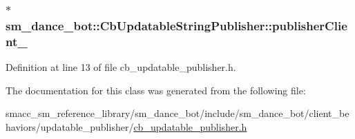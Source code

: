 \subsubsection[{\texorpdfstring{publisher\+Client\+\_\+}{publisherClient_}}]{$\ast$ sm\+\_\+dance\+\_\+bot\+::\+Cb\+Updatable\+String\+Publisher\+::publisher\+Client\+\_\+}\hypertarget{classsm__dance__bot_1_1CbUpdatableStringPublisher_a4dbf2a2bd48ce6193617e5aba596caaf}{}\label{classsm__dance__bot_1_1CbUpdatableStringPublisher_a4dbf2a2bd48ce6193617e5aba596caaf}


Definition at line 13 of file cb\+\_\+updatable\+\_\+publisher.\+h.



The documentation for this class was generated from the following file\+:\begin{DoxyCompactItemize}
\item 
smacc\+\_\+sm\+\_\+reference\+\_\+library/sm\+\_\+dance\+\_\+bot/include/sm\+\_\+dance\+\_\+bot/client\+\_\+behaviors/updatable\+\_\+publisher/\hyperlink{cb__updatable__publisher_8h}{cb\+\_\+updatable\+\_\+publisher.\+h}\end{DoxyCompactItemize}
